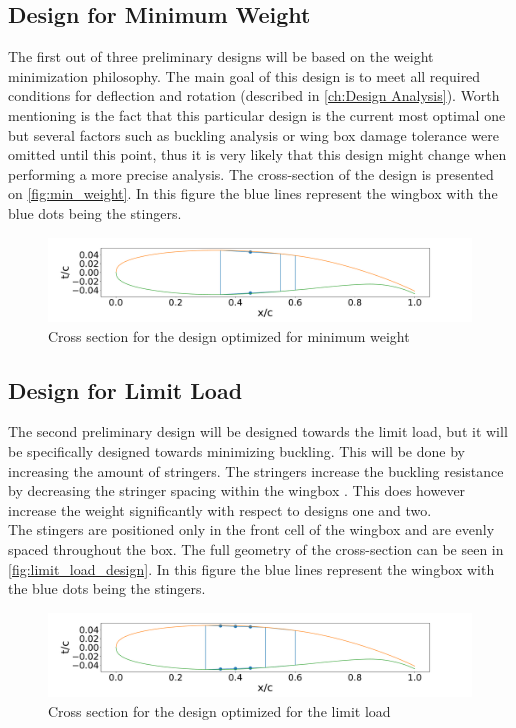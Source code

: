 \subsection*{Design for Minimum Weight}
The first out of three preliminary designs will be based on the weight minimization philosophy. The main goal of this design is to meet all required conditions for deflection and rotation (described in \autoref{ch:Design Analysis}). Worth mentioning is the fact that this particular design is the current most optimal one but several factors such as buckling analysis or wing box damage tolerance were omitted until this point, thus it is very likely that this design might change when performing a more precise analysis. The cross-section of the design is presented on \autoref{fig:min_weight}. In this figure the blue lines represent the wingbox with the blue dots being the stingers.

\begin{figure}[H]
    \centering
    \includegraphics[width=0.9\linewidth]{figures/Cross_section_min_W.pdf}
    \caption{Cross section for the design optimized for minimum weight}
    \label{fig:min_weight}
\end{figure}

\subsection*{Design for Limit Load}
The second preliminary design will be designed towards the limit load, but it will be specifically designed towards minimizing buckling. This will be done by increasing the amount of stringers. The stringers increase the buckling resistance by decreasing the stringer spacing within the wingbox \cite{Timmer2024Project5}. This does however increase the weight significantly with respect to designs one and two.\\
The stingers are positioned only in the front cell of the wingbox and are evenly spaced throughout the box. The full geometry of the cross-section can be seen in \autoref{fig:limit_load_design}. In this figure the blue lines represent the wingbox with the blue dots being the stingers.
\begin{figure}[H]
    \centering
    \includegraphics[width=0.9\linewidth]{figures/Cross_section_lim_load.pdf}
    \caption{Cross section for the design optimized for the limit load}
    \label{fig:limit_load_design}
\end{figure}

